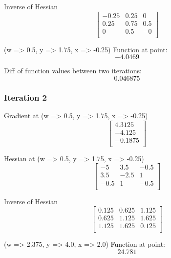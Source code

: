 \documentclass{article}
\begin{document}
Inverse of Hessian
\begin{equation}
\left[
\begin{array}{ccc}
-0.25 & 0.25 & 0 \\
0.25 & 0.75 & 0.5 \\
0 & 0.5 & -0 \\
\end{array}
\right]
\end{equation}

(w => 0.5, y => 1.75, x => -0.25)
Function at point:
\begin{equation}
-4.0469
\end{equation}

Diff of function values between two iterations:
\begin{equation}
0.046875
\end{equation}

\subsubsection{Iteration 2}
Gradient at (w => 0.5, y => 1.75, x => -0.25)
\begin{equation}
\left[
\begin{array}{c}
4.3125 \\
-4.125 \\
-0.1875 \\
\end{array}
\right]
\end{equation}

Hessian at (w => 0.5, y => 1.75, x => -0.25)
\begin{equation}
\left[
\begin{array}{ccc}
-5 & 3.5 & -0.5 \\
3.5 & -2.5 & 1 \\
-0.5 & 1 & -0.5 \\
\end{array}
\right]
\end{equation}

Inverse of Hessian
\begin{equation}
\left[
\begin{array}{ccc}
0.125 & 0.625 & 1.125 \\
0.625 & 1.125 & 1.625 \\
1.125 & 1.625 & 0.125 \\
\end{array}
\right]
\end{equation}

(w => 2.375, y => 4.0, x => 2.0)
Function at point:
\begin{equation}
24.781
\end{equation}
\end{document}
